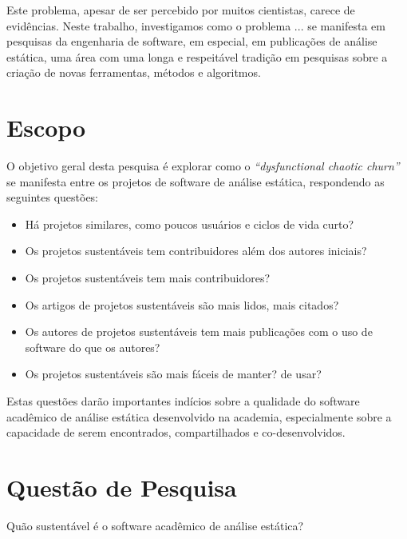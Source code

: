 
Este problema, apesar de ser percebido por muitos cientistas, carece de
evidências. %
Neste trabalho, investigamos como o problema ...  se manifesta em pesquisas da
engenharia de software, em especial, em publicações de análise estática, uma
área com uma longa e respeitável tradição em pesquisas sobre a criação de novas
ferramentas, métodos e algoritmos.

\section{Escopo}

O objetivo geral desta pesquisa é explorar como o {\it ``dysfunctional chaotic
churn''} se manifesta entre os projetos de software de análise estática,
respondendo as seguintes questões:

\begin{itemize}
  \item Há projetos similares, como poucos usuários e ciclos de vida curto?
  \item Os projetos sustentáveis tem contribuidores além dos autores iniciais?
  \item Os projetos sustentáveis tem mais contribuidores?
  \item Os artigos de projetos sustentáveis são mais lidos, mais citados?
  \item Os autores de projetos sustentáveis tem mais publicações com o uso de software do que os autores?
  \item Os projetos sustentáveis são mais fáceis de manter? de usar? 
\end{itemize}

Estas questões darão importantes indícios sobre a qualidade do software acadêmico de
análise estática desenvolvido na academia, especialmente sobre a capacidade de serem 
encontrados, compartilhados e co-desenvolvidos.

\section{Questão de Pesquisa}

Quão sustentável é o software acadêmico de análise estática?

